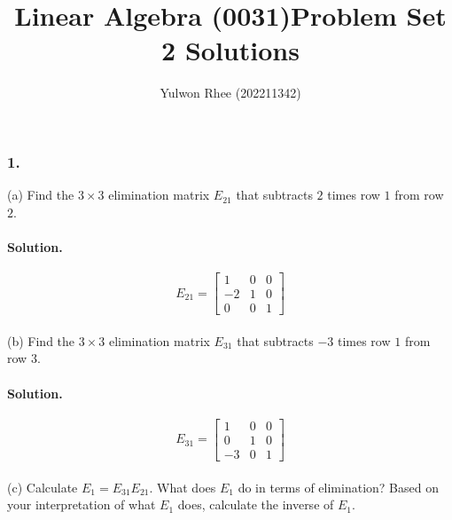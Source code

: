 



\title{Linear Algebra (0031)\newline\space Problem Set 2 Solutions}
\author{Yulwon Rhee (202211342)}

\maketitle
\subsubsection{1.}
(a) Find the $3 \times 3$ elimination matrix $E_{21}$ that subtracts $2$ times row $1$ from row $2$.
\paragraph*{Solution.}
$$E_{21} = \begin{bmatrix}
    1&0&0\\
    -2&1&0\\
    0&0&1
\end{bmatrix}$$\\

(b) Find the $3 \times 3$ elimination matrix $E_{31}$ that subtracts $-3$ times row $1$ from row $3$.
\paragraph*{Solution.}
$$E_{31} = \begin{bmatrix}
    1&0&0\\
    0&1&0\\
    -3&0&1
\end{bmatrix}$$\\

(c) Calculate $E_1=E_{31}E_{21}$. What does $E_1$ do in terms of elimination?
Based on your interpretation of what $E_1$ does, calculate the inverse of $E_1$.

